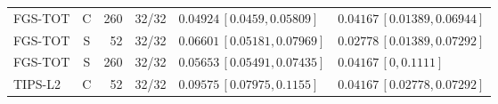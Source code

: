 \begin{longtable}{lcrcp{44mm}p{44mm}}
FGS-TOT & C & 260 & 32/32 & \(0.04924\,[0.0459,0.05809]\) & \(0.04167\,[0.01389,0.06944]\)\\
FGS-TOT & S & 52 & 32/32 & \(0.06601\,[0.05181,0.07969]\) & \(0.02778\,[0.01389,0.07292]\)\\
FGS-TOT & S & 260 & 32/32 & \(0.05653\,[0.05491,0.07435]\) & \(0.04167\,[0,0.1111]\)\\
TIPS-L2 & C & 52 & 32/32 & \(0.09575\,[0.07975,0.1155]\) & \(0.04167\,[0.02778,0.07292]\)\\

\end{longtable}
